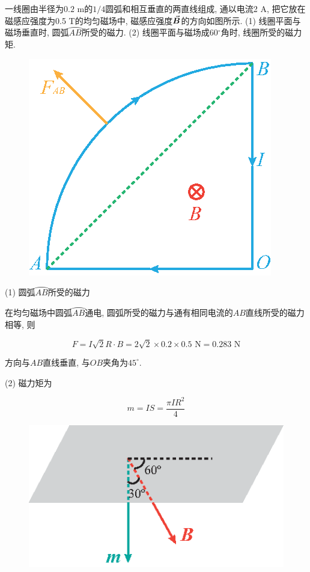 \begin{example}
	一线圈由半径为$0.2$ m的$1/4$圆弧和相互垂直的两直线组成, 通以电流2 A, 把它放在磁感应强度为0.5 T的均匀磁场中, 磁感应强度$\va*{B}$的方向如图所示. 
	(1) 线圈平面与磁场垂直时, 圆弧$\wideparen{AB}$所受的磁力. 
	(2) 线圈平面与磁场成60$^{\circ}$角时, 线圈所受的磁力矩. 
	
	\begin{figure}[H]
		\centering
		\includegraphics[scale=0.8]{C8-fig17.eps}
	\end{figure}
	
	\begin{solution}
		
		(1) 圆弧$\wideparen{AB}$所受的磁力 
		
		在均匀磁场中圆弧$\wideparen{AB}$通电, 圆弧所受的磁力与通有相同电流的$AB$直线所受的磁力相等, 则
		
		\begin{equation*}
			F = I \sqrt{2} R \cdot B = 2\sqrt{2} \times 0.2 \times 0.5 \textrm{~N} = 0.283 \textrm{~N}
		\end{equation*}
		
		方向与$AB$直线垂直, 与$OB$夹角为$45^{\circ}$.
		
		(2) 磁力矩为
		
		\begin{equation*}
			m = IS = \dfrac{\pi I R^2}{4}
		\end{equation*}
		
		\begin{figure}[H]
			\centering
			\includegraphics[scale=0.8]{C8-fig18.eps}
		\end{figure}
		

\end{solution}
\end{example}
